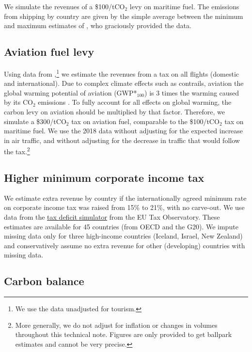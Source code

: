 \documentclass[12pt,english]{article}
\begin{document}
\begin{bibunit}
We simulate the revenues of a \$100/tCO$_\text{2}$ levy on maritime fuel. The emissions from shipping by country are given by the simple average between the minimum and maximum estimates of \citet{dequiedt_navigating_2024}, who graciously provided the data. 

\subsection{Aviation fuel levy}\label{sec:wealth}

Using data from \cite{graver_CO2_2018},\footnote{We use the data unadjusted for tourism.} we estimate the revenues from a tax on all flights (domestic and international). Due to complex climate effects such as contrails, aviation the global warming potential of aviation (GWP*$_\text{100}$) is 3 times the warming caused by its CO$_\text{2}$ emissions \citep{lee_contribution_2021}. To fully account for all effects on global warming, the carbon levy on aviation should be multiplied by that factor. Therefore, we simulate a \$300/tCO$_\text{2}$ tax on aviation fuel, comparable to the \$100/tCO$_\text{2}$ tax on maritime fuel. We use the 2018 data without adjusting for the expected increase in air traffic, and without adjusting for the decrease in traffic that would follow the tax.\footnote{More generally, we do not adjust for inflation or changes in volumes throughout this technical note. Figures are only provided to get ballpark estimates and cannot be very precise.}

\subsection{Higher minimum corporate income tax}

We estimate extra revenue by country if the internationally agreed minimum rate on corporate income tax was raised from 15\% to 21\%, with no carve-out. We use data from the \href{https://www.taxobservatory.eu/fr/base-de-donn%C3%A9es/the-tax-deficit-simulator/}{tax deficit simulator} from the EU Tax Observatory. These estimates are available for 45 countries (from OECD and the G20). We impute missing data only for three high-income countries (Iceland, Israel, New Zealand) and conservatively assume no extra revenue for other (developing) countries with missing data.

\subsection{Carbon balance}


\end{bibunit}
\end{document}
